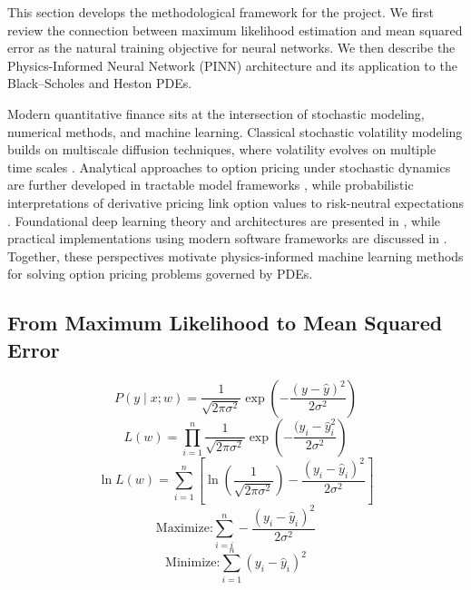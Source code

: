 
This section develops the methodological framework for the project. We first review the connection between maximum likelihood estimation and mean squared error as the natural training objective for neural networks. We then describe the Physics-Informed Neural Network (PINN) architecture and its application to the Black--Scholes and Heston PDEs.

Modern quantitative finance sits at the intersection of stochastic modeling, numerical methods, and machine learning. Classical stochastic volatility modeling builds on multiscale diffusion techniques, where volatility evolves on multiple time scales \parencite{fouque2011multiscale}. Analytical approaches to option pricing under stochastic dynamics are further developed in tractable model frameworks \parencite{gulisashvili2012analytically}, while probabilistic interpretations of derivative pricing link option values to risk-neutral expectations \parencite{optionsprobabilities}. Foundational deep learning theory and architectures are presented in \textcite{goodfellow2016deep}, while practical implementations using modern software frameworks are discussed in \textcite{raschka2022ml}. Together, these perspectives motivate physics-informed machine learning methods for solving option pricing problems governed by PDEs.

\subsection{From Maximum Likelihood to Mean Squared Error}\label{subsection:mle2mse}

\begin{equation}
    P(y \mid x;w) = \frac{1}{\sqrt{2\pi\sigma^2}} \exp{\left( -\frac{(y-\hat{y})^2}{2\sigma^2}\right)} 
\end{equation}
\begin{equation}
    L(w)=\prod_{i=1}^{n} \frac{1}{\sqrt{2\pi\sigma^2}} \exp{\left(-\frac{(y_i-\hat{y}_i^2}{2\sigma^2}\right)}
\end{equation}
\begin{equation}
    \ln L(w) = \sum_{i=1}^{n} \left[ \ln \left( \frac{1}{\sqrt{2\pi\sigma^2}} \right) - \frac{(y_i-\hat{y}_i)^2}{2\sigma^2} \right]
\end{equation}
\begin{equation}
    \text{Maximize:} \sum_{i=i}^{n}-\frac{(y_i-\hat{y}_i)^2}{2\sigma^2}
\end{equation}
\begin{equation}
    \text{Minimize:} \sum_{i=1}^{n}(y_i-\hat{y}_i)^2
\end{equation}

